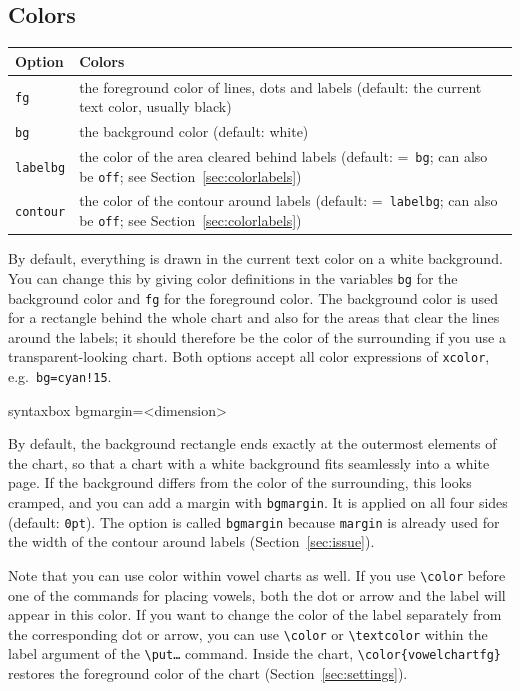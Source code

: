 \documentclass[a4paper,11pt]{article}
\newcommand\cmd[1]{\texttt{\textbackslash #1}}
\newcommand\opt[1]{\texttt{#1}}
\newcommand\pkg[1]{\texttt{#1}}
\begin{document}
\subsection{Colors} \label{sec:colors}

\begin{center}
	\begin{tabular}{@{}p{1.3cm}p{14.2cm}@{}}
		\toprule
		Option & Colors \\
		\midrule
		\opt{fg} & the foreground color of lines, dots and labels (default: the current text color, usually black) \\
		\opt{bg} & the background color (default: white) \\
		\opt{labelbg} & the color of the area cleared behind labels (default: =~\opt{bg}; can also be \opt{off}; see Section~\ref{sec:colorlabels}) \\
		\opt{contour} & the color of the contour around labels (default: =~\opt{labelbg}; can also be \opt{off}; see Section~\ref{sec:colorlabels}) \\
		\bottomrule
	\end{tabular}
\end{center}

\noindent
By default, everything is drawn in the current text color on a white background. You can change this by giving color definitions in the variables \opt{bg} for the background color and \opt{fg} for the foreground color. The background color is used for a rectangle behind the whole chart and also for the areas that clear the lines around the labels; it should therefore be the color of the surrounding if you use a transparent-looking chart. Both options accept all color expressions of \pkg{xcolor}, e.g.\ \opt{bg=cyan!15}.

\begin{tcblisting}{syntaxbox}
bgmargin=<dimension>
\end{tcblisting}

\noindent
By default, the background rectangle ends exactly at the outermost elements of the chart, so that a chart with a white background fits seamlessly into a white page. If the background differs from the color of the surrounding, this looks cramped, and you can add a margin with \opt{bgmargin}. It is applied on all four sides (default: \texttt{0pt}). The option is called \opt{bgmargin} because \opt{margin} is already used for the width of the contour around labels (Section~\ref{sec:issue}).

Note that you can use color within vowel charts as well. If you use \cmd{color} before one of the commands for placing vowels, both the dot or arrow and the label will appear in this color.
If you want to change the color of the label separately from the corresponding dot or arrow, you can use \cmd{color} or \cmd{textcolor} within the label argument of the \cmd{put…} command.
Inside the chart, \verb|\color{vowelchartfg}| restores the foreground color of the chart (Section~\ref{sec:settings}).
\end{document}
